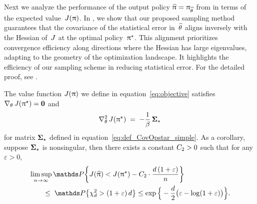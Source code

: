 Next we analyze the performance of the output policy \mbox{$\widehat{\uppi} = \uppi_{\widehat{\theta}}$} from  in terms of the expected value~$J(\uppi)$. In , we show that our proposed sampling method guarantees that the covariance of the statistical error in~$\widehat{\theta}$ aligns inversely with the Hessian of~$J$ at the optimal policy~$\uppi^{\star}$. This alignment prioritizes convergence efficiency along directions where the Hessian has large eigenvalues, adapting to the geometry of the optimization landscape. It highlights the efficiency of our sampling scheme in reducing statistical error.
For the detailed proof, see .
\begin{theorem}
        \label{lemma:hess_scalarvalue}
    The value function $J(\uppi)$ we define in equation~\eqref{eq:objective} satisfies $\nabla_{\theta} \,  J(\uppi^{\star}) = \boldsymbol{0}$ and %
    \begin{align}
        \label{eq:hessscalarvalue}
        \nabla_{\theta}^2 \,  J(\uppi^{\star}) \; = \;
        - \frac{1}{\beta} \, \boldsymbol{\Sigma}_{\star}
    \end{align} %
    for matrix $\boldsymbol{\Sigma}_{\star}$ defined in equation~\eqref{eq:def_CovOpstar_simple}.
    As a corollary, suppose $\boldsymbol{\Sigma}_{\star}$ is nonsingular, then there exists a constant $C_{2} > 0$ such that for any $\varepsilon > 0$, 
    \begin{align}
        & \limsup_{\numobs \rightarrow \infty} \Prob \bigg\{ \scalarvalue(\policyhat) < \scalarvalue(\policystar) - \Const_{2} \cdot \frac{\Dim \, (1 + \varepsilon)}{\numobs} \bigg\} \notag  \\
        & \qquad \leq \; \Prob\big\{ \chisquare_{\Dim} > (1 + \varepsilon) \, \Dim \big\}
        \leq \exp\Big\{  -\frac{\Dim}{2} \bigl(\varepsilon - \log(1 + \varepsilon)\bigr)  \Big\} . \label{eq:gap_bd}
    \end{align}
\end{theorem}		

